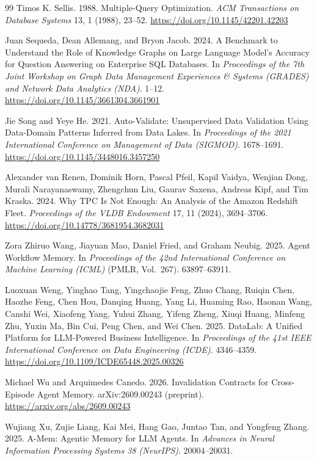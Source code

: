 \begin{thebibliography}{99}
Timos K. Sellis. 1988. Multiple-Query Optimization. \emph{ACM Transactions on Database Systems} 13, 1 (1988), 23--52. \url{https://doi.org/10.1145/42201.42203}

Juan Sequeda, Dean Allemang, and Bryon Jacob. 2024. A Benchmark to Understand the Role of Knowledge Graphs on Large Language Model's Accuracy for Question Answering on Enterprise SQL Databases. In \emph{Proceedings of the 7th Joint Workshop on Graph Data Management Experiences \& Systems (GRADES) and Network Data Analytics (NDA)}. 1--12. \url{https://doi.org/10.1145/3661304.3661901}

Jie Song and Yeye He. 2021. Auto-Validate: Unsupervised Data Validation Using Data-Domain Patterns Inferred from Data Lakes. In \emph{Proceedings of the 2021 International Conference on Management of Data (SIGMOD)}. 1678--1691. \url{https://doi.org/10.1145/3448016.3457250}

Alexander van Renen, Dominik Horn, Pascal Pfeil, Kapil Vaidya, Wenjian Dong, Murali Narayanaswamy, Zhengchun Liu, Gaurav Saxena, Andreas Kipf, and Tim Kraska. 2024. Why TPC Is Not Enough: An Analysis of the Amazon Redshift Fleet. \emph{Proceedings of the VLDB Endowment} 17, 11 (2024), 3694--3706. \url{https://doi.org/10.14778/3681954.3682031}

Zora Zhiruo Wang, Jiayuan Mao, Daniel Fried, and Graham Neubig. 2025. Agent Workflow Memory. In \emph{Proceedings of the 42nd International Conference on Machine Learning (ICML)} (PMLR, Vol.~267). 63897--63911.

Luoxuan Weng, Yinghao Tang, Yingchaojie Feng, Zhuo Chang, Ruiqin Chen, Haozhe Feng, Chen Hou, Danqing Huang, Yang Li, Huaming Rao, Haonan Wang, Canshi Wei, Xiaofeng Yang, Yuhui Zhang, Yifeng Zheng, Xiuqi Huang, Minfeng Zhu, Yuxin Ma, Bin Cui, Peng Chen, and Wei Chen. 2025. DataLab: A Unified Platform for LLM-Powered Business Intelligence. In \emph{Proceedings of the 41st IEEE International Conference on Data Engineering (ICDE)}. 4346--4359. \url{https://doi.org/10.1109/ICDE65448.2025.00326}

Michael Wu and Arquimedes Canedo. 2026. Invalidation Contracts for Cross-Episode Agent Memory. arXiv:2609.00243 (preprint). \url{https://arxiv.org/abs/2609.00243}

Wujiang Xu, Zujie Liang, Kai Mei, Hang Gao, Juntao Tan, and Yongfeng Zhang. 2025. A-Mem: Agentic Memory for LLM Agents. In \emph{Advances in Neural Information Processing Systems 38 (NeurIPS)}. 20004--20031.


\end{thebibliography}
